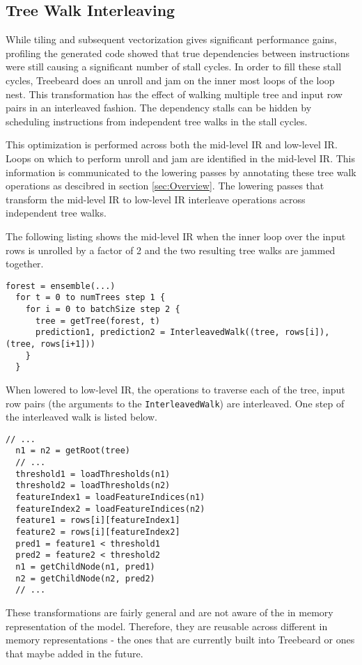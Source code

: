 \subsection{Tree Walk Interleaving}
While tiling and subsequent vectorization gives significant performance gains, profiling 
the generated code showed that true dependencies between instructions were still causing
a significant number of stall cycles. In order to fill these stall cycles, Treebeard does 
an unroll and jam on the inner most loops of the loop nest. This transformation has 
the effect of walking multiple tree and input row pairs in an interleaved fashion. 
The dependency stalls can be hidden by scheduling instructions from independent tree walks 
in the stall cycles. 

This optimization is performed across both the mid-level IR and low-level IR. Loops on which 
to perform unroll and jam are identified in the mid-level IR. This information is communicated to the 
lowering passes by annotating these tree walk operations as descibred in section \ref{sec:Overview}. The lowering 
passes that transform the mid-level IR to low-level IR interleave operations across independent
tree walks.

The following listing shows the mid-level IR when the inner loop over the input rows is unrolled 
by a factor of 2 and the two resulting tree walks are jammed together.

\begin{lstlisting}[style=c++]
  forest = ensemble(...)
  for t = 0 to numTrees step 1 {
    for i = 0 to batchSize step 2 {
      tree = getTree(forest, t)
      prediction1, prediction2 = InterleavedWalk((tree, rows[i]), (tree, rows[i+1]))
    }
  }
\end{lstlisting}

When lowered to low-level IR, the operations to traverse each of the tree, input row pairs 
(the arguments to the \texttt{InterleavedWalk}) are interleaved. One step of the interleaved 
walk is listed below. 
\begin{lstlisting}[style=c++]
  // ... 
  n1 = n2 = getRoot(tree)
  // ...
  threshold1 = loadThresholds(n1)
  threshold2 = loadThresholds(n2)
  featureIndex1 = loadFeatureIndices(n1)
  featureIndex2 = loadFeatureIndices(n2)
  feature1 = rows[i][featureIndex1]
  feature2 = rows[i][featureIndex2]
  pred1 = feature1 < threshold1
  pred2 = feature2 < threshold2
  n1 = getChildNode(n1, pred1)
  n2 = getChildNode(n2, pred2)
  // ...
\end{lstlisting}
These transformations are fairly general and are not aware of the in memory representation of the model. Therefore, they 
are reusable across different in memory representations - the ones that are currently built into Treebeard or ones that 
maybe added in the future.
